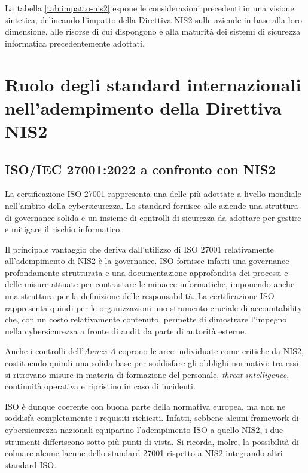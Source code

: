 La tabella \ref{tab:impatto-nis2} espone le considerazioni precedenti in una visione sintetica, delineando l'impatto della 
Direttiva NIS2 sulle aziende in base alla loro dimensione, alle risorse di cui dispongono e alla maturità dei sistemi di
sicurezza informatica precedentemente adottati.



\section{Ruolo degli standard internazionali nell'adempimento della Direttiva NIS2}
\subsection{ISO/IEC 27001:2022 a confronto con NIS2}
La certificazione ISO 27001 rappresenta una delle più adottate a livello mondiale nell'ambito della cybersicurezza.
Lo standard fornisce alle aziende una struttura di governance solida e un insieme di controlli di sicurezza da adottare 
per gestire e mitigare il rischio informatico.

Il principale vantaggio che deriva dall'utilizzo di ISO 27001 relativamente all'adempimento di NIS2 è la governance.
ISO fornisce infatti una governance profondamente strutturata e una documentazione approfondita dei processi e delle misure
attuate per contrastare le minacce informatiche, imponendo anche una struttura per la definizione delle responsabilità.
La certificazione ISO rappresenta quindi per le organizzazioni uno strumento cruciale di accountability che, con un costo 
relativamente contenuto, permette di dimostrare l'impegno nella cybersicurezza a fronte di audit da parte di autorità esterne.

Anche i controlli dell'\textit{Annex A} coprono le aree individuate come critiche da NIS2, costituendo quindi una solida 
base per soddisfare gli obblighi normativi: tra essi si ritrovano misure in materia di formazione del personale, \textit{threat intelligence},
continuità operativa e ripristino in caso di incidenti.

ISO è dunque coerente con buona parte della normativa europea, ma non ne soddisfa completamente i requisiti richiesti. Infatti, sebbene 
alcuni framework di cybersicurezza nazionali equiparino l'adempimento ISO a quello NIS2, i due strumenti differiscono sotto più punti di vista.
Si ricorda, inolre, la possibilità di colmare alcune lacune dello standard 27001 rispetto a NIS2 integrando altri standard ISO.

